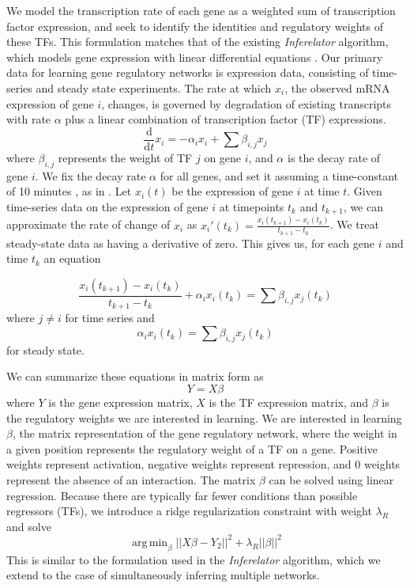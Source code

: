 \documentclass[11pt]{article}
\DeclareMathOperator*{\argmin}{arg\,min}
\begin{document}
We model the transcription rate of each gene as a weighted sum of transcription factor expression, and seek to identify the identities and regulatory weights of these TFs. 
This formulation matches that of the existing \textit{Inferelator} algorithm, which models gene expression with linear differential equations \cite{bonneau_inferelator:_2006-1}. Our primary data for learning gene regulatory networks is expression data, consisting of time-series and steady state experiments. 
The rate at which $x_{i}$, the observed mRNA expression of gene $i$, changes, is governed by degradation of existing transcripts with rate $\alpha$ plus a linear combination of transcription factor (TF) expressions. 
\begin{equation}
\frac{\mathrm d}{\mathrm d t} x_i = -\alpha_{i}x_{i} + \sum \beta_{i,j}x_{j}
\end{equation}
where $\beta_{i,j}$ represents the weight of TF $j$ on gene $i$, and $\alpha$ is the decay rate of gene $i$. We fix the decay rate $\alpha$ for all genes, and set it assuming a time-constant of 10 minutes \cite{hambraeus_genome-wide_2003, selinger_global_2003}, as in \cite{greenfield_robust_2013}. Let $x_i(t)$ be the expression of gene $i$ at time $t$. 
Given time-series data on the expression of gene $i$ at timepoints $t_k$ and $t_{k+1}$, we can approximate the rate of change of $x_i$ as $x_i'(t_k)=\frac{x_i(t_{k+1})-x_i(t_k)}{t_{k+1}-t_k}$. 
We treat steady-state data as having a derivative of zero. 
This gives us, for each gene $i$ and time $t_{k}$ an equation

\begin{equation}
\frac{x_i(t_{k+1})-x_i(t_k)}{t_{k+1}-t_k} + \alpha_{i}x_{i}(t_k)= \sum \beta_{i,j}x_{j}(t_k)
\end{equation}
where $j \neq i$ 
for time series and 
\begin{equation}
\alpha_{i}x_{i}(t_k) = \sum \beta_{i,j}x_{j}(t_k)
\end{equation}
for steady state. 


\noindent We can summarize these equations in matrix form as
\begin{equation}
Y = X \beta 
\end{equation}
where $Y$ is the gene expression matrix, $X$ is the TF expression matrix, and $\beta$ is the regulatory weights we are interested in learning.
We are interested in learning $\beta$, the matrix representation of the gene regulatory network, where the weight in a given position represents the regulatory weight of a TF on a gene. 
Positive weights represent activation, negative weights represent repression, and 0 weights represent the absence of an interaction. The matrix $\beta$ can be solved using linear regression. 
Because there are typically far fewer conditions than possible regressors (TFs), we introduce a ridge regularization constraint with weight $\lambda_R$ and solve
\begin{equation}
\argmin_\beta\vert \vert X\beta - Y_2 \vert \vert ^2 + \lambda_R \vert \vert \beta \vert \vert ^2
\end{equation}
This is similar to the formulation used in the \textit{Inferelator} algorithm, which we extend to the case of simultaneously inferring multiple networks.
\end{document}
